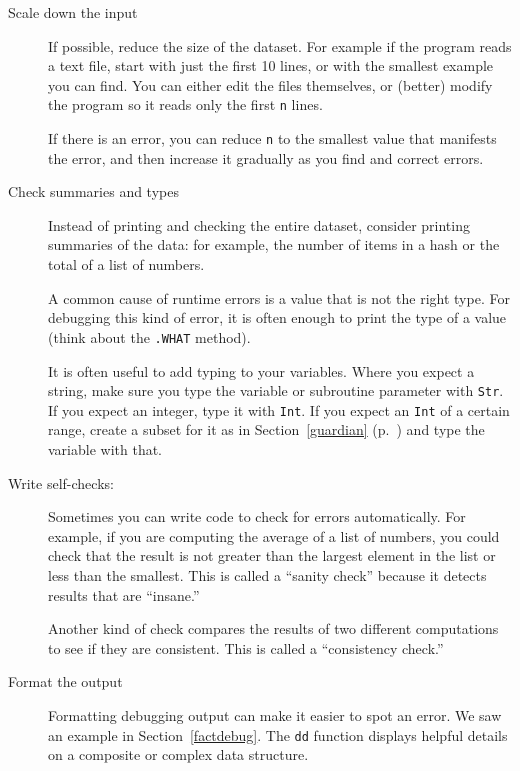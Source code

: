 \begin{description}

\item[Scale down the input] If possible, reduce the size of the
dataset.  For example if the program reads a text file, start with
just the first 10 lines, or with the smallest example you can find.
You can either edit the files themselves, or (better) modify the
program so it reads only the first {\tt n} lines.

If there is an error, you can reduce {\tt n} to the smallest
value that manifests the error, and then increase it gradually
as you find and correct errors.

\item[Check summaries and types] Instead of printing and checking the
entire dataset, consider printing summaries of the data: for example,
the number of items in a hash or the total of a list of numbers.

A common cause of runtime errors is a value that is not the right
type.  For debugging this kind of error, it is often enough to print
the type of a value (think about the {\tt .WHAT} method).

It is often useful to add typing to your variables. Where you 
expect a string, make sure you type the variable or subroutine 
parameter with {\tt Str}. If you expect an integer, type it with 
{\tt Int}. If you expect an {\tt Int} of a certain range, create 
a subset for it as in Section~\ref{guardian} (p.~\pageref{guardian}) 
and type the variable with that.

\item[Write self-checks:]  Sometimes you can write code to check
for errors automatically.  For example, if you are computing the
average of a list of numbers, you could check that the result is
not greater than the largest element in the list or less than
the smallest.  This is called a ``sanity check'' because it detects
results that are ``insane.''

Another kind of check compares the results of two different
computations to see if they are consistent.  This is called a
``consistency check.''

\item[Format the output] Formatting debugging output
can make it easier to spot an error.  We saw an example in
Section~\ref{factdebug}.  The {\tt dd} function displays 
helpful details on a composite or complex data structure.


\end{description}

